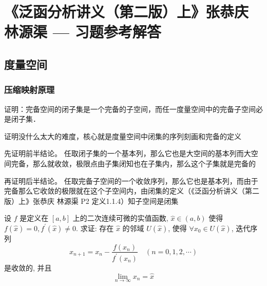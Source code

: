 \chapter{《泛函分析讲义（第二版）上》张恭庆 林源渠 --- 习题参考解答}


\section{度量空间}


\subsection{压缩映射原理}

\begin{exercise}
  证明：完备空间的闭子集是一个完备的子空间，而任一度量空间中的完备子空间必是闭子集．
\end{exercise}

\begin{answer}
  \begin{analysis}
    证明没什么太大的难度，核心就是度量空间中闭集的序列刻画和完备的定义
  \end{analysis}
  \begin{step}
    \item 先证明前半结论。
      任取闭子集的一个基本列，那么它也是大空间的基本列而大空间完备，那么就收敛，极限点由子集闭知也在子集内，那么这个子集就是完备的
    \item 再证明后半结论。
      任取完备子空间的一个收敛序列，那么它也是基本列，而由于完备那么它收敛的极限就在这个子空间内，由闭集的定义（《泛函分析讲义（第二版）上》张恭庆 林源渠 P2 定义1.1.4）知子空间是闭集
  \end{step}
\end{answer}


\begin{exercise}[title = {Newton 法}]
  设 $f$ 是定义在 $[a, b]$ 上的二次连续可微的实值函数, $\widehat{x} \in(a, b)$ 使得 $f(\widehat{x})=0, f^{\prime}(\widehat{x}) \neq 0$. 求证: 存在 $\widehat{x}$ 的邻域 $U(\widehat{x})$, 使得 $\forall x_{0} \in U(\widehat{x})$, 迭代序列
  \[
  x_{n+1}=x_{n}-\frac{f\left(x_{n}\right)}{f^{\prime}\left(x_{n}\right)} \quad(n=0,1,2, \cdots)
  \]
  是收敛的, 并且
  \[
  \lim _{n \rightarrow \infty} x_{n}=\widehat{x}
  \]
\end{exercise}


